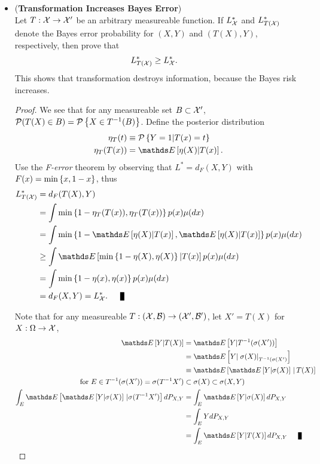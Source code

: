 \documentclass[11pt]{article}
\begin{document}
\begin{itemize}
\item \begin{exercise} (\textbf{Transformation Increases Bayes Error}) \citep{devroye2013probabilistic}\\
Let $T: {\mathcal X}\rightarrow {\mathcal X}' $ be an arbitrary measureable function. If $L_{{\mathcal X}}^{*}$ and $L_{T({\mathcal X})}^{*}$ denote the Bayes error probability for $(X,Y)$ and $(T(X), Y)$, respectively, then prove that 
\begin{align*}
L_{T({\mathcal X})}^{*} &\ge L_{{\mathcal X}}^{*}.
\end{align*}
This shows that transformation destroys information, because the Bayes risk increases. 
\end{exercise}
\begin{proof}
We see that for any measureable set $B\subset {\mathcal X}'$,  ${\mathcal P}(T(X)\in B) = {\mathcal P}\left\{X\in T^{-1}(B)\right\}$. Define the posterior distribution 
\begin{align*}
\eta_{T}(t) &\equiv \cP\set{Y=1| T(x)= t}\\
\eta_{T}(T(x)) &= \E{}{\eta(X)| T(x)}.\\
\end{align*} 
Use the \emph{F-error} theorem by observing that $L^{*} = d_{F}(X,Y)$ with $F(x) = \min\left\{x, 1-x\right\}$, thus
\begin{align*}
L_{T(\cX)}^{*}&=  d_{F}(T(X),Y)\\
&= \int \min\set{1- \eta_{T}(T(x)),  \eta_{T}(T(x))}p(x)\mu(dx)\\
&=  \int \min\set{1- \E{}{\eta(X)| T(x)},  \E{}{\eta(X)| T(x)}}p(x)\mu(dx)\\
&\ge \int \E{}{ \min\set{1- \eta(X), \eta(X)}  | T(x)} p(x)\mu(dx)\\
&= \int \min\set{1- \eta(x), \eta(x)}p(x)\mu(dx)\\
& = d_{F}(X,Y)=  L_{\cX}^{*}.\qed \\
\end{align*} 

Note that for any measureable $T: ({\mathcal X}, {\mathcal B}) \rightarrow ({\mathcal X}', {\mathcal B}')$, let $X'= T(X)$ for $X: \Omega \rightarrow {\mathcal X}$,
\begin{align*}
\E{}{Y| T(X)} &= \E{}{Y| T^{-1}(\sigma(X'))}\\
&= \E{}{Y| \rlat{\sigma(X)}{T^{-1}(\sigma(X')}}\\
& \equiv \E{}{\E{}{Y|\sigma(X)}\,|\,T(X)} \\
\text{for } E\in T^{-1}(\sigma(X'))= \sigma(T^{-1}X') &\subset \sigma(X) \subset \sigma(X,Y) \\
 \int_{E} \E{}{\E{}{Y|\sigma(X)}\,|\sigma(T^{-1}X')}dP_{X,Y}& = \int_{E} \E{}{Y|\sigma(X)} dP_{X,Y}  \\
 &= \int_{E}Y dP_{X,Y}\\
 &= \int_{E} \E{}{Y| T(X)} dP_{X,Y} \qed
\end{align*} 
\end{proof}


\end{itemize}
\end{document}
